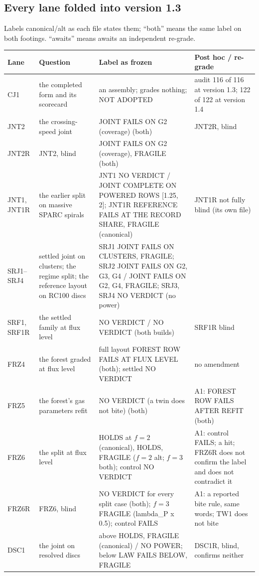 \documentclass[10pt]{article}
\begin{document}
\subsection{Every lane folded into version 1.3}
Labels canonical/alt as each file states them; ``both'' means the same label on both footings. ``awaits'' means awaits an independent re-grade.
{\footnotesize
\begin{longtable}{@{}p{1.9cm}p{3.6cm}p{5.6cm}p{4.6cm}@{}}\toprule
Lane & Question & Label as frozen & Post hoc / re-grade\\\midrule\endhead
CJ1 & the completed form and its scorecard & an assembly; grades nothing; NOT ADOPTED & audit 116 of 116 at version 1.3; 122 of 122 at version 1.4\\
JNT2 & the crossing-speed joint & JOINT FAILS ON G2 (coverage) (both) & JNT2R, blind\\
JNT2R & JNT2, blind & JOINT FAILS ON G2 (coverage), FRAGILE (both) & \\
JNT1, JNT1R & the earlier split on massive SPARC spirals & JNT1 NO VERDICT / JOINT COMPLETE ON POWERED ROWS [1.25, 2]; JNT1R REFERENCE FAILS AT THE RECORD SHARE, FRAGILE (canonical) & JNT1R not fully blind (its own file)\\
SRJ1--SRJ4 & settled joint on clusters; the regime split; the reference layout on RC100 discs & SRJ1 JOINT FAILS ON CLUSTERS, FRAGILE; SRJ2 JOINT FAILS ON G2, G3, G4 / JOINT FAILS ON G2, G4, FRAGILE; SRJ3, SRJ4 NO VERDICT (no power) & \\
SRF1, SRF1R & the settled family at flux level & NO VERDICT / NO VERDICT (both builds) & SRF1R blind\\
FRZ4 & the forest graded at flux level & full layout FOREST ROW FAILS AT FLUX LEVEL (both); settled NO VERDICT & no amendment\\
FRZ5 & the forest's gas parameters refit & NO VERDICT (a twin does not bite) (both) & A1: FOREST ROW FAILS AFTER REFIT (both)\\
FRZ6 & the split at flux level & HOLDS at $f=2$ (canonical), HOLDS, FRAGILE ($f=2$ alt; $f=3$ both); control NO VERDICT & A1: control FAILS; a hit; FRZ6R does not confirm the label and does not contradict it\\
FRZ6R & FRZ6, blind & NO VERDICT for every split case (both); $f=3$ FRAGILE (lambda\_P x 0.5); control FAILS & A1: a reported bite rule, same words; TW1 does not bite\\
DSC1 & the joint on resolved discs & above HOLDS, FRAGILE (canonical) / NO POWER; below LAW FAILS BELOW, FRAGILE & DSC1R, blind, confirms neither\\

\end{longtable}}
\end{document}
